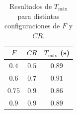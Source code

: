 
\begin{table}[H]
\centering
\begin{tabular}{|c|c|c|}
\hline
\textbf{$F$} & \textbf{$CR$} & \textbf{$T_{\text{máx}}$ (s)} \\
\hline
$0.4$ & $0.5$ & $0.89$ \\
\hline
$0.6$ & $0.7$ & $0.91$ \\
\hline
$0.75$ & $0.9$ & $0.86$ \\
\hline
$0.9$ & $0.9$ & $0.89$ \\
\hline
\end{tabular}
\caption{Resultados de $T_{\text{máx}}$ para distintas configuraciones de $F$ y $CR$.}
\label{tab:kruskal_configs}
\end{table}



